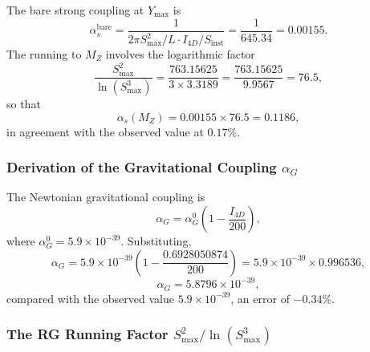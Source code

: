 \documentclass[a4paper,1pt,oneside,openany]{book}
\begin{document}
The bare strong coupling at $Y_{\max}$ is
\begin{equation}
\alpha_s^{\mathrm{bare}} = \frac{1}{2\pi S_{\max}^2/L \cdot I_{4D}/S_{\mathrm{inst}}} = \frac{1}{645.34} = 0.00155.
\label{eq:alphas-bare}
\end{equation}
The running to $M_Z$ involves the logarithmic factor
\begin{equation}
\frac{S_{\max}^2}{\ln(S_{\max}^3)} = \frac{763.15625}{3 \times 3.3189} = \frac{763.15625}{9.9567} = 76.5,
\label{eq:running-factor}
\end{equation}
so that
\begin{equation}
\alpha_s(M_Z) = 0.00155 \times 76.5 = 0.1186,
\label{eq:alphas-via-factor}
\end{equation}
in agreement with the observed value at $0.17\%$.

\subsubsection{Derivation of the Gravitational Coupling $\alpha_G$}

The Newtonian gravitational coupling is
\begin{equation}
\alpha_G = \alpha_G^0 \left(1 - \frac{I_{4D}}{200}\right),
\label{eq:alphaG-def}
\end{equation}
where $\alpha_G^0 = 5.9 \times 10^{-39}$. Substituting,
\begin{equation}
\alpha_G = 5.9 \times 10^{-39} \left(1 - \frac{0.6928050874}{200}\right) = 5.9 \times 10^{-39} \times 0.996536,
\label{eq:alphaG-num}
\end{equation}
\begin{equation}
\boxed{\alpha_G = 5.8796 \times 10^{-39},}
\label{eq:alphaG-final}
\end{equation}
compared with the observed value $5.9 \times 10^{-39}$, an error of $-0.34\%$.

\subsubsection{The RG Running Factor $S_{\max}^2/\ln(S_{\max}^3)$}
\end{document}
